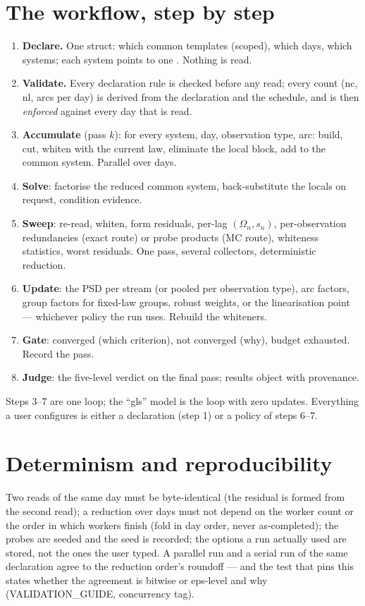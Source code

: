 \section{The workflow, step by step}
\label{sec:workflow}

\begin{enumerate}
\item \textbf{Declare.} One  struct: which common templates (scoped), which days, which systems; each system points to one . Nothing is read.
\item \textbf{Validate.} Every declaration rule is checked before any read; every count (nc, nl, arcs per day) is derived from the declaration and the schedule, and is then \emph{enforced} against every day that is read.
\item \textbf{Accumulate} (pass $k$): for every system, day, observation type, arc: build, cut, whiten with the current law, eliminate the local block, add to the common system. Parallel over days.
\item \textbf{Solve}: factorise the reduced common system, back-substitute the locals on request, condition evidence.
\item \textbf{Sweep}: re-read, whiten, form residuals, per-lag $(\Omega_n, s_n)$, per-observation redundancies (exact route) or probe products (MC route), whiteness statistics, worst residuals. One pass, several collectors, deterministic reduction.
\item \textbf{Update}: the PSD per stream (or pooled per observation type), arc factors, group factors for fixed-law groups, robust weights, or the linearisation point --- whichever policy the run uses. Rebuild the whiteners.
\item \textbf{Gate}: converged (which criterion), not converged (why), budget exhausted. Record the pass.
\item \textbf{Judge}: the five-level verdict on the final pass; results object with provenance.
\end{enumerate}
Steps 3--7 are one loop; the ``gls'' model is the loop with zero updates. Everything a user configures is either a declaration (step 1) or a policy of steps 6--7.

\section{Determinism and reproducibility}

Two reads of the same day must be byte-identical (the residual is formed from the second read); a reduction over days must not depend on the worker count or the order in which workers finish (fold in day order, never as-completed); the probes are seeded and the seed is recorded; the options a run actually used are stored, not the ones the user typed. A parallel run and a serial run of the same declaration agree to the reduction order's roundoff --- and the test that pins this states whether the agreement is bitwise or eps-level and why (VALIDATION\_GUIDE, concurrency tag).

